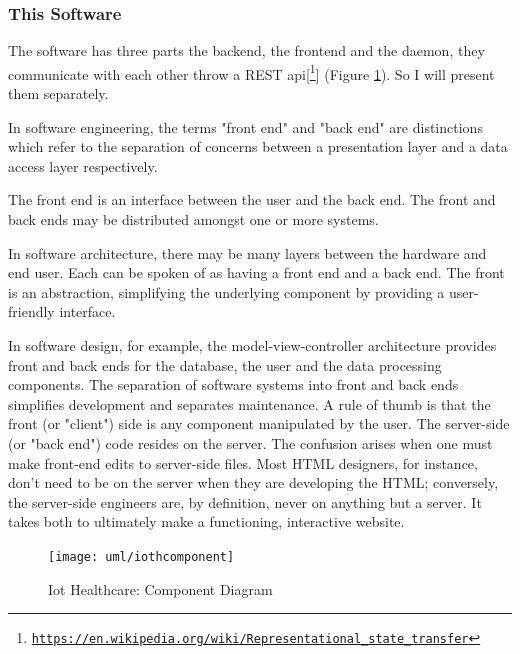 \subsubsection*{This Software}

The software has three parts the backend, the frontend and the daemon, they communicate with each other throw a REST api[\footnote{\href{https://en.wikipedia.org/wiki/Representational\_state\_transfer}{\texttt{https://en.wikipedia.org/wiki/Representational\_state\_transfer}}}] (Figure \ref{fig:iothcomponentdiagram5}). So I will present them separately. 
\newline

In software engineering, the terms "front end" and "back end" are distinctions which refer to the separation of concerns between a presentation layer and a data access layer respectively.
\newline

The front end is an interface between the user and the back end. The front and back ends may be distributed amongst one or more systems.
\newline

In software architecture, there may be many layers between the hardware and end user. Each can be spoken of as having a front end and a back end. The front is an abstraction, simplifying the underlying component by providing a user-friendly interface.
\newline

In software design, for example, the model-view-controller architecture provides front and back ends for the database, the user and the data processing components. The separation of software systems into front and back ends simplifies development and separates maintenance. A rule of thumb is that the front (or "client") side is any component manipulated by the user. The server-side (or "back end") code resides on the server. The confusion arises when one must make front-end edits to server-side files. Most HTML designers, for instance, don't need to be on the server when they are developing the HTML; conversely, the server-side engineers are, by definition, never on anything but a server. It takes both to ultimately make a functioning, interactive website.

\begin{figure}[h]
	\centering
	\texttt{[image: uml/iothcomponent]}
	\caption{Iot Healthcare: Component Diagram}
	\label{fig:iothcomponentdiagram5}
\end{figure}

